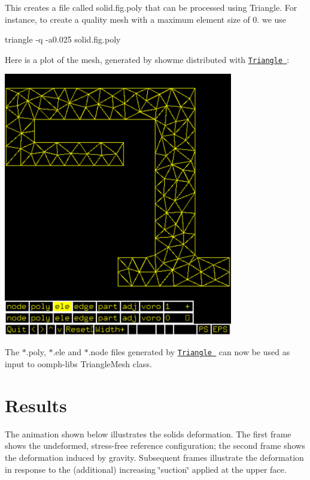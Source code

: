This creates a file called {\ttfamily solid.\+fig.\+poly} that can be processed using Triangle. For instance, to create a quality mesh with a maximum element size of 0. we use 
\begin{DoxyCode}
triangle -q -a0.025 solid.fig.poly
\end{DoxyCode}


Here is a plot of the mesh, generated by {\ttfamily showme} distributed with \href{http://www.cs.cmu.edu/~quake/triangle.html}{\tt {\ttfamily Triangle} }\+:

 
\begin{DoxyImage}
\includegraphics[width=0.75\textwidth]{showme_screenshot}
\end{DoxyImage}


The {\ttfamily  $\ast$.poly, $\ast$.ele } and {\ttfamily  $\ast$.node } files generated by \href{http://www.cs.cmu.edu/~quake/triangle.html}{\tt {\ttfamily Triangle} } can now be used as input to {\ttfamily oomph-\/lib\textquotesingle{}s} {\ttfamily Triangle\+Mesh} class.



 

\hypertarget{index_results}{}\section{Results}\label{index_results}
The animation shown below illustrates the solid\textquotesingle{}s deformation. The first frame shows the undeformed, stress-\/free reference configuration; the second frame shows the deformation induced by gravity. Subsequent frames illustrate the deformation in response to the (additional) increasing \char`\"{}suction\char`\"{} applied at the upper face.

